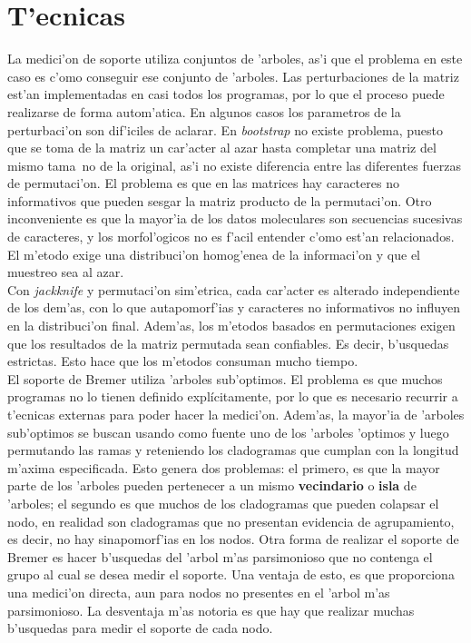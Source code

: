 \section{T'ecnicas}
La medici'on de soporte utiliza conjuntos de 'arboles, as'i que el problema en este caso es c'omo conseguir ese conjunto de 'arboles. Las perturbaciones de la matriz est'an implementadas en casi todos los programas, por lo que el proceso puede realizarse de forma autom'atica. En algunos casos los parametros de la perturbaci'on son dif'iciles de aclarar. En \textit{bootstrap} no existe problema, puesto que se toma de la matriz un car'acter al azar hasta completar una matriz del mismo tama~no de la original, as'i no existe diferencia entre las diferentes fuerzas de permutaci'on. El problema es que en las matrices hay caracteres no informativos que pueden sesgar la matriz producto de la permutaci'on. Otro inconveniente es que la mayor'ia de los datos moleculares son secuencias sucesivas de caracteres, y los morfol'ogicos no es f'acil entender c'omo est'an relacionados. El m'etodo exige una distribuci'on homog'enea de la informaci'on y que el muestreo sea al azar.\\
Con \textit{jackknife} y permutaci'on sim'etrica, cada car'acter es alterado independiente de los dem'as, con lo que autapomorf'ias y caracteres no informativos no influyen en la distribuci'on final. Adem'as, los m'etodos basados en permutaciones exigen que los resultados de la matriz permutada sean confiables. Es decir, b'usquedas estrictas. Esto hace que los m'etodos consuman mucho tiempo.\\
El soporte de Bremer utiliza 'arboles sub'optimos. El problema es que muchos programas no lo tienen definido expl\'icitamente, por lo que es necesario recurrir a t'ecnicas externas para poder hacer la medici'on. Adem'as, la mayor'ia de 'arboles sub'optimos se buscan usando como fuente uno de los 'arboles 'optimos y luego permutando las ramas y reteniendo los cladogramas que cumplan con la longitud m'axima especificada. Esto genera dos problemas: el primero, es que la mayor parte de los 'arboles pueden pertenecer a un mismo \textbf{vecindario} o \textbf{isla} de 'arboles; el segundo es que muchos de los cladogramas que pueden colapsar el nodo, en realidad son cladogramas que no presentan evidencia de agrupamiento, es decir, no hay sinapomorf'ias en los nodos. Otra forma de realizar el soporte de Bremer es hacer b'usquedas del 'arbol m'as parsimonioso que no contenga el grupo al cual se desea medir el soporte. Una ventaja de esto, es que proporciona una medici'on directa, aun para nodos no presentes en el 'arbol m'as parsimonioso. La desventaja m'as notoria es que hay que realizar muchas b'usquedas para medir el soporte de cada nodo.
